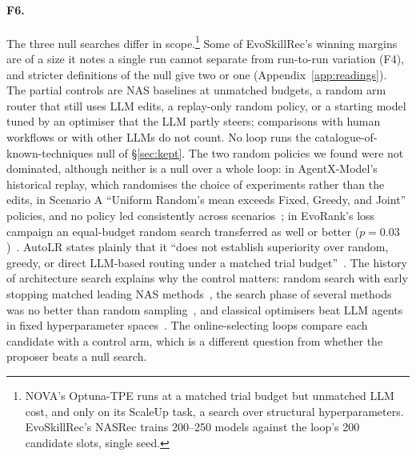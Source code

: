 \documentclass[sigconf,nonacm]{acmart}
\begin{document}
\paragraph{F6.} The three null searches differ in scope.\footnote{NOVA's Optuna-TPE runs at a matched trial
budget but unmatched LLM cost, and only on its ScaleUp task, a search over structural hyperparameters. EvoSkillRec's NASRec trains 200--250 models against the loop's 200 candidate slots, single seed.} Some of EvoSkillRec's winning margins are of a size it notes a single run cannot separate from run-to-run variation (F4), and stricter definitions of the null give two or one (Appendix~\ref{app:readings}). The partial controls are NAS baselines at unmatched budgets, a random arm router that still uses LLM edits, a
replay-only random policy, or a starting model tuned by an optimiser that the LLM partly steers;
comparisons with human workflows or with other LLMs do not count. No loop runs the catalogue-of-known-techniques null of \S\ref{sec:kept}. The two random policies we found were not dominated, although neither is a null over a whole loop: in AgentX-Model's historical replay, which randomises the choice of experiments rather than the edits, in
Scenario A ``Uniform Random's mean exceeds Fixed, Greedy, and Joint'' policies, and no policy led consistently across
scenarios~\cite{yang2026agentxmodel}; in
EvoRank's loss campaign an equal-budget random search transferred as well or better ($p=0.03$)~\cite{patel2026evorank}.
AutoLR states plainly that it ``does not establish superiority over random, greedy, or direct LLM-based routing under a
matched trial budget''~\cite{zhang2026autolr}. The history of architecture search explains why the control matters: random
search with early stopping matched leading NAS methods~\cite{li2019randomnas}, the search phase of several methods was no
better than random sampling~\cite{yu2020searchphase,yang2020nashard}, and classical optimisers beat LLM agents in fixed
hyperparameter spaces~\cite{ferreira2026hpo,rodrigues2026llmhpo}. The online-selecting loops compare each candidate with a
control arm, which is a different question from whether the proposer beats a null search.
\end{document}
